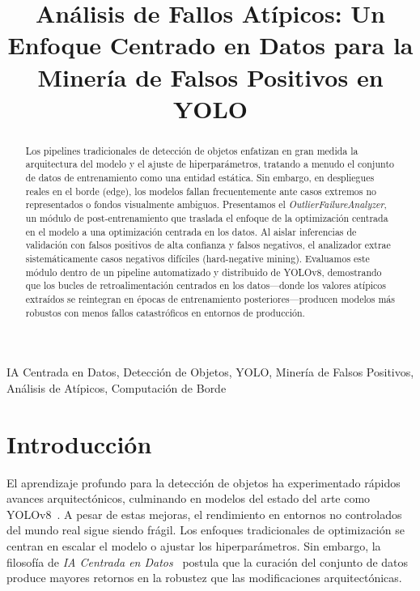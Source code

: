 \documentclass[conference]{IEEEtran}
\begin{document}
\title{Análisis de Fallos Atípicos: Un Enfoque Centrado en Datos para la Minería de Falsos Positivos en YOLO}

\author{
}

\maketitle

\begin{abstract}
Los pipelines tradicionales de detección de objetos enfatizan en gran medida la arquitectura del modelo y el ajuste de hiperparámetros, tratando a menudo el conjunto de datos de entrenamiento como una entidad estática. Sin embargo, en despliegues reales en el borde (edge), los modelos fallan frecuentemente ante casos extremos no representados o fondos visualmente ambiguos. Presentamos el \textit{OutlierFailureAnalyzer}, un módulo de post-entrenamiento que traslada el enfoque de la optimización centrada en el modelo a una optimización centrada en los datos. Al aislar inferencias de validación con falsos positivos de alta confianza y falsos negativos, el analizador extrae sistemáticamente casos negativos difíciles (hard-negative mining). Evaluamos este módulo dentro de un pipeline automatizado y distribuido de YOLOv8, demostrando que los bucles de retroalimentación centrados en los datos—donde los valores atípicos extraídos se reintegran en épocas de entrenamiento posteriores—producen modelos más robustos con menos fallos catastróficos en entornos de producción.
\end{abstract}

\begin{IEEEkeywords}
IA Centrada en Datos, Detección de Objetos, YOLO, Minería de Falsos Positivos, Análisis de Atípicos, Computación de Borde
\end{IEEEkeywords}

\section{Introducción}
El aprendizaje profundo para la detección de objetos ha experimentado rápidos avances arquitectónicos, culminando en modelos del estado del arte como YOLOv8~\cite{redmon2016you, jocher2023yolo}. A pesar de estas mejoras, el rendimiento en entornos no controlados del mundo real sigue siendo frágil. Los enfoques tradicionales de optimización se centran en escalar el modelo o ajustar los hiperparámetros. Sin embargo, la filosofía de \textit{IA Centrada en Datos}~\cite{ng2021datacentric} postula que la curación del conjunto de datos produce mayores retornos en la robustez que las modificaciones arquitectónicas.
\end{document}
